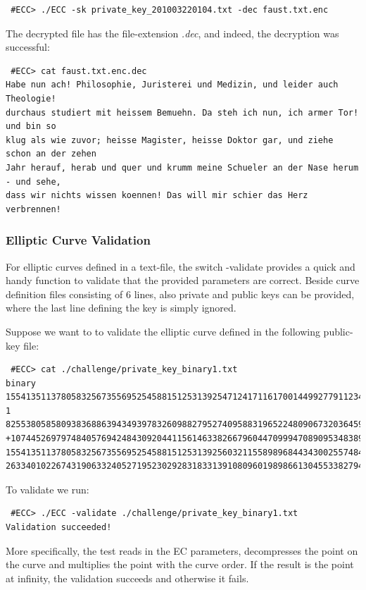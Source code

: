 \documentclass[11pt,english]{article}
\begin{document}
\begin{verbatim}
 #ECC> ./ECC -sk private_key_201003220104.txt -dec faust.txt.enc
\end{verbatim}

The decrypted file has the file-extension \emph{.dec}, and indeed, the decryption was successful:

\begin{verbatim}
 #ECC> cat faust.txt.enc.dec
Habe nun ach! Philosophie, Juristerei und Medizin, und leider auch Theologie!
durchaus studiert mit heissem Bemuehn. Da steh ich nun, ich armer Tor! und bin so
klug als wie zuvor; heisse Magister, heisse Doktor gar, und ziehe schon an der zehen
Jahr herauf, herab und quer und krumm meine Schueler an der Nase herum - und sehe,
dass wir nichts wissen koennen! Das will mir schier das Herz verbrennen!
\end{verbatim}

\subsubsection{Elliptic Curve Validation}
For elliptic curves defined in a text-file, the switch -validate provides a quick and handy function to validate that the provided parameters are correct. Beside curve definition files consisting of 6 lines, also private and public keys can be provided, where the last line defining the key is simply ignored.

Suppose we want to to validate the elliptic curve defined in the following public-key file:

\begin{verbatim}
 #ECC> cat ./challenge/private_key_binary1.txt
binary
15541351137805832567355695254588151253139254712417116170014499277911234281641667989665
1
8255380585809383688639434939783260988279527409588319652248090673203645932948626009724
+10744526979748405769424843092044115614633826679604470999470890953483892379364112110203
15541351137805832567355695254588151253139256032115589896844343002557484362928298853438
26334010226743190633240527195230292831833139108096019898661304553382794977231705
\end{verbatim}

To validate we run:

\begin{verbatim}
 #ECC> ./ECC -validate ./challenge/private_key_binary1.txt
Validation succeeded!
\end{verbatim}

More specifically, the test reads in the EC parameters, decompresses the point on the curve and multiplies the point with the curve order. If the result is the point at infinity, the validation succeeds and otherwise it fails.
\end{document}
